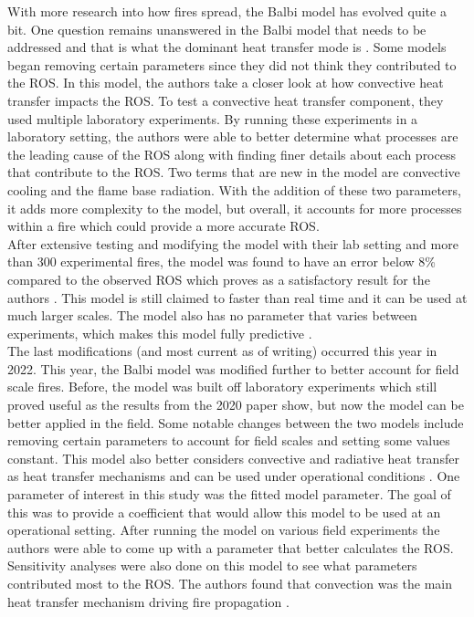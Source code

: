 \documentclass{article}
\begin{document}
\indent With more research into how fires spread, the Balbi model has evolved quite a bit. One question remains unanswered in the Balbi model that needs to be addressed and that is what the dominant heat transfer mode is \citep{Balbi2020}. Some models began removing certain parameters since they did not think they contributed to the ROS. In this model, the authors take a closer look at how convective heat transfer impacts the ROS. To test a convective heat transfer component, they used multiple laboratory experiments. By running these experiments in a laboratory setting, the authors were able to better determine what processes are the leading cause of the ROS along with finding finer details about each process that contribute to the ROS. Two terms that are new in the model are convective cooling and the flame base radiation. With the addition of these two parameters, it adds more complexity to the model, but overall, it accounts for more processes within a fire which could provide a more accurate ROS. \\
\indent After extensive testing and modifying the model with their lab setting and more than 300 experimental fires, the model was found to have an error below 8\% compared to the observed ROS which proves as a satisfactory result for the authors \citep{Balbi2020}. This model is still claimed to faster than real time and it can be used at much larger scales. The model also has no parameter that varies between experiments, which makes this model fully predictive \citep{Chatelon2022}.  \\
\indent The last modifications (and most current as of writing) occurred this year in 2022. This year, the Balbi model was modified further to better account for field scale fires. Before, the model was built off laboratory experiments which still proved useful as the results from the 2020 paper show, but now the model can be better applied in the field. Some notable changes between the two models include removing certain parameters to account for field scales and setting some values constant. This model also better considers convective and radiative heat transfer as heat transfer mechanisms and can be used under operational conditions \citep{Chatelon2022}. One parameter of interest in this study was the fitted model parameter. The goal of this was to provide a coefficient that would allow this model to be used at an operational setting. After running the model on various field experiments the authors were able to come up with a parameter that better calculates the ROS. Sensitivity analyses were also done on this model to see what parameters contributed most to the ROS. The authors found that convection was the main heat transfer mechanism driving fire propagation \citep{Chatelon2022}. \\
\end{document}
